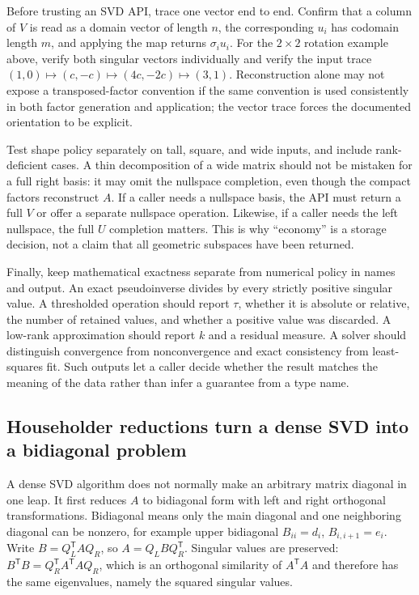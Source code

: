 Before trusting an SVD API, trace one vector end to end. Confirm that a column of \(V\) is read as a domain vector of length \(n\), the corresponding \(u_i\) has codomain length \(m\), and applying the map returns \(\sigma_i u_i\). For the \(2\times2\) rotation example above, verify both singular vectors individually and verify the input trace \((1,0)\mapsto(c,-c)\mapsto(4c,-2c)\mapsto(3,1)\). Reconstruction alone may not expose a transposed-factor convention if the same convention is used consistently in both factor generation and application; the vector trace forces the documented orientation to be explicit.

Test shape policy separately on tall, square, and wide inputs, and include rank-deficient cases. A thin decomposition of a wide matrix should not be mistaken for a full right basis: it may omit the nullspace completion, even though the compact factors reconstruct \(A\). If a caller needs a nullspace basis, the API must return a full \(V\) or offer a separate nullspace operation. Likewise, if a caller needs the left nullspace, the full \(U\) completion matters. This is why ``economy'' is a storage decision, not a claim that all geometric subspaces have been returned.

Finally, keep mathematical exactness separate from numerical policy in names and output. An exact pseudoinverse divides by every strictly positive singular value. A thresholded operation should report \(\tau\), whether it is absolute or relative, the number of retained values, and whether a positive value was discarded. A low-rank approximation should report \(k\) and a residual measure. A solver should distinguish convergence from nonconvergence and exact consistency from least-squares fit. Such outputs let a caller decide whether the result matches the meaning of the data rather than infer a guarantee from a type name.

\subsection{Householder reductions turn a dense SVD into a bidiagonal problem}\label{householder-reductions-turn-a-dense-svd-into-a-bidiagonal-problem}

A dense SVD algorithm does not normally make an arbitrary matrix diagonal in one leap. It first reduces \(A\) to bidiagonal form with left and right orthogonal transformations. Bidiagonal means only the main diagonal and one neighboring diagonal can be nonzero, for example upper bidiagonal \(B_{ii}=d_i\), \(B_{i,i+1}=e_i\). Write \(B=Q_L^\mathsf TAQ_R\), so \(A=Q_LBQ_R^\mathsf T\). Singular values are preserved: \(B^\mathsf TB=Q_R^\mathsf TA^\mathsf TAQ_R\), which is an orthogonal similarity of \(A^\mathsf TA\) and therefore has the same eigenvalues, namely the squared singular values.

